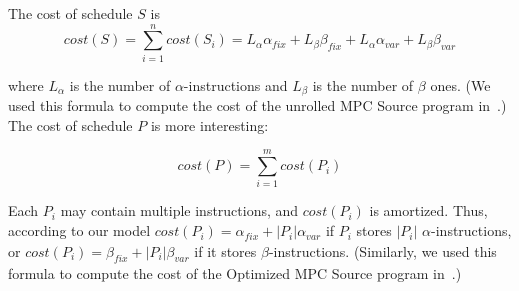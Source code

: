 

The cost of schedule $S$ is
\begin{equation}
    \mathit{cost}(S) = \sum_{i=1}^n \mathit{cost}(S_i) = L_\alpha \alpha_\mathit{fix} + L_\beta \beta_\mathit{fix} + L_\alpha \alpha_\mathit{var} + L_\beta \beta_\mathit{var}
\end{equation}

where $L_\alpha$ is the number of $\alpha$-instructions and $L_\beta$ is the number of $\beta$ ones.
(We used this formula to compute the cost of the unrolled MPC Source program in~.)
The cost of schedule $P$ is more interesting:

\begin{equation}\label{eq_par_schedule_cost}
    \mathit{cost}(P) = \sum_{i=1}^m \mathit{cost}(P_i)
\end{equation}

Each $P_i$ may contain multiple instructions, and $\mathit{cost}(P_i)$ is amortized.
Thus, according to our model $\mathit{cost}(P_i) = \alpha_\mathit{fix} + |P_i|\alpha_\mathit{var}$ if $P_i$ stores $|P_i|$ $\alpha$-instructions, 
or $\mathit{cost}(P_i) = \beta_\mathit{fix} + |P_i|\beta_\mathit{var}$ if it stores $\beta$-instructions. 
(Similarly, we used this formula to compute the cost of the Optimized MPC Source program in~.)

